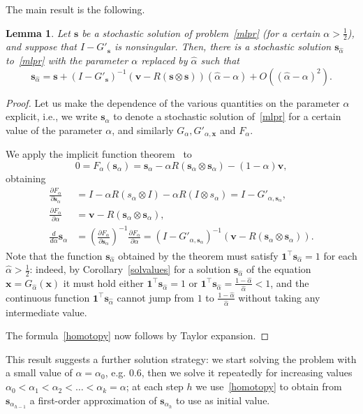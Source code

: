 \documentclass[10pt]{paper}
\newtheorem{lemma}[theorem]{Lemma}
\begin{document}
The main result is the following.
\begin{lemma}
Let ${\mathbf{s}}$ be a stochastic solution of problem~\eqref{mlpr} (for a certain $\alpha>\frac12$), and suppose that $I - G'_{\mathbf{s}}$ is nonsingular. Then, there is a stochastic solution ${\mathbf{s}}_{\hat{\alpha}}$ to~\eqref{mlpr} with the parameter $\alpha$ replaced by $\hat{\alpha}$ such that
\begin{equation} \label{homotopy}
	{\mathbf{s}}_{\hat{\alpha}} = {\mathbf{s}} + (I - G'_{\mathbf{s}})^{-1}({\mathbf{v}} - R({\mathbf{s}} \otimes {\mathbf{s}}))(\hat{\alpha}-\alpha) + O((\hat{\alpha} - \alpha)^2).	
\end{equation}
\end{lemma}
\begin{proof}
	Let us make the dependence of the various quantities on the parameter $\alpha$ explicit, i.e., we write ${\mathbf{s}}_\alpha$ to denote a stochastic solution of~\eqref{mlpr} for a certain value of the parameter $\alpha$, and similarly $G_\alpha, G'_{\alpha,{\mathbf{x}}}$ and $F_\alpha$.

	We apply the implicit function theorem~\cite[Theorem~9.28]{BabyRudin} to
	\[
		0 = F_\alpha({\mathbf{s}}_\alpha) = {\mathbf{s}}_\alpha - \alpha R({\mathbf{s}}_\alpha \otimes {\mathbf{s}}_\alpha ) - (1-\alpha) {\mathbf{v}},
	\]
	obtaining
	\begin{align*}
	\frac{\partial F_\alpha}{\partial {\mathbf{s}}_\alpha} & = I - \alpha R(s_\alpha \otimes I) - \alpha R(I \otimes s_\alpha) = I - G'_{\alpha,{\mathbf{s}}_\alpha},\\
	\frac{\partial F_\alpha}{\partial \alpha} &= {\mathbf{v}} - R({\mathbf{s}}_\alpha \otimes {\mathbf{s}}_\alpha),
	\\
	\frac{d}{d\alpha} {\mathbf{s}}_{\alpha} &= \left(\frac{\partial F_\alpha}{\partial {\mathbf{s}}_\alpha}\right)^{-1} \frac{\partial F_\alpha}{\partial \alpha} = (I - G'_{\alpha,{\mathbf{s}}_\alpha})^{-1}({\mathbf{v}} - R({\mathbf{s}}_\alpha \otimes {\mathbf{s}}_\alpha)).
	\end{align*}
	Note that the function ${\mathbf{s}}_{\hat{\alpha}}$ obtained by the theorem must satisfy ${\mathbf{1}}^\top {\mathbf{s}}_{\hat{\alpha}} = 1$ for each $\hat{\alpha} > \frac12$: indeed, by Corollary~\ref{solvalues} for a solution ${\mathbf{s}}_{\hat{\alpha}}$ of the equation ${\mathbf{x}} = G_{\hat{\alpha}}({\mathbf{x}})$ it must hold either ${\mathbf{1}}^\top {\mathbf{s}}_{\hat{\alpha}} = 1$ or ${\mathbf{1}}^\top {\mathbf{s}}_{\hat{\alpha}} = \frac{1-\hat{\alpha}}{\hat{\alpha}} < 1$, and the continuous function ${\mathbf{1}}^\top {\mathbf{s}}_{\hat{\alpha}}$ cannot jump from $1$ to $\frac{1-\hat{\alpha}}{\hat{\alpha}}$ without taking any intermediate value.

	The formula~\eqref{homotopy} now follows by Taylor expansion.
\end{proof}
This result suggests a further solution strategy: we start solving the problem with a small value of $\alpha= \alpha_0$, e.g. $0.6$, then we solve it repeatedly for increasing values $\alpha_0 < \alpha_1 < \alpha_2 < \dots < \alpha_k = \alpha$; at each step $h$ we use~\eqref{homotopy} to obtain from ${\mathbf{s}}_{\alpha_{h-1}}$ a first-order approximation of ${\mathbf{s}}_{\alpha_h}$ to use as initial value.
\end{document}

